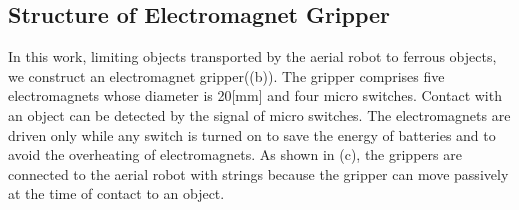 \subsection{Structure of Electromagnet Gripper}
In this work, limiting objects transported by the aerial robot to ferrous objects, we construct an electromagnet gripper((b)). The gripper comprises five electromagnets whose diameter is 20[mm] and four micro switches. Contact with an object can be detected by the signal of micro switches. The electromagnets are driven only while any switch is turned on to save the energy of batteries and to avoid the overheating of electromagnets. As shown in (c), the grippers are connected to the aerial robot with strings because the gripper can move passively at the time of contact to an object.

